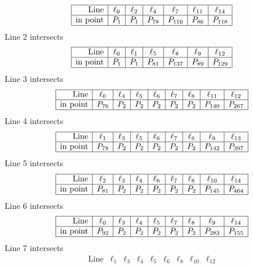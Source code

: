 \documentclass{article}
\begin{document}
{$$\begin{array}{|r*{6}{|c}|}
\hline
\mbox{Line}  & \ell_{0} & \ell_{2} & \ell_{4} & \ell_{7} & \ell_{11} & \ell_{14}\\
\hline
\mbox{in point}  & P_{1} & P_{1} & P_{78} & P_{110} & P_{86} & P_{118}\\
\hline
\end{array}
$$
Line 2 intersects 
$$
\begin{array}{|r*{6}{|c}|}
\hline
\mbox{Line}  & \ell_{0} & \ell_{1} & \ell_{5} & \ell_{8} & \ell_{9} & \ell_{12}\\
\hline
\mbox{in point}  & P_{1} & P_{1} & P_{81} & P_{137} & P_{89} & P_{129}\\
\hline
\end{array}
$$
Line 3 intersects 
$$
\begin{array}{|r*{8}{|c}|}
\hline
\mbox{Line}  & \ell_{0} & \ell_{4} & \ell_{5} & \ell_{6} & \ell_{7} & \ell_{8} & \ell_{11} & \ell_{12}\\
\hline
\mbox{in point}  & P_{76} & P_{2} & P_{2} & P_{2} & P_{2} & P_{2} & P_{140} & P_{267}\\
\hline
\end{array}
$$
Line 4 intersects 
$$
\begin{array}{|r*{8}{|c}|}
\hline
\mbox{Line}  & \ell_{1} & \ell_{3} & \ell_{5} & \ell_{6} & \ell_{7} & \ell_{8} & \ell_{9} & \ell_{13}\\
\hline
\mbox{in point}  & P_{78} & P_{2} & P_{2} & P_{2} & P_{2} & P_{2} & P_{142} & P_{397}\\
\hline
\end{array}
$$
Line 5 intersects 
$$
\begin{array}{|r*{8}{|c}|}
\hline
\mbox{Line}  & \ell_{2} & \ell_{3} & \ell_{4} & \ell_{6} & \ell_{7} & \ell_{8} & \ell_{10} & \ell_{14}\\
\hline
\mbox{in point}  & P_{81} & P_{2} & P_{2} & P_{2} & P_{2} & P_{2} & P_{145} & P_{464}\\
\hline
\end{array}
$$
Line 6 intersects 
$$
\begin{array}{|r*{8}{|c}|}
\hline
\mbox{Line}  & \ell_{0} & \ell_{3} & \ell_{4} & \ell_{5} & \ell_{7} & \ell_{8} & \ell_{9} & \ell_{14}\\
\hline
\mbox{in point}  & P_{92} & P_{2} & P_{2} & P_{2} & P_{2} & P_{2} & P_{283} & P_{155}\\
\hline
\end{array}
$$
Line 7 intersects 
$$
\begin{array}{|r*{8}{|c}|}
\hline
\mbox{Line}  & \ell_{1} & \ell_{3} & \ell_{4} & \ell_{5} & \ell_{6} & \ell_{8} & \ell_{10} & \ell_{12}\\

\end{array}$$}
\end{document}
